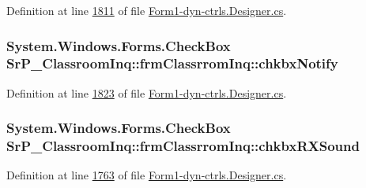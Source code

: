 \-Definition at line \hyperlink{_form1-dyn-ctrls_8_designer_8cs_source_l01811}{1811} of file \hyperlink{_form1-dyn-ctrls_8_designer_8cs_source}{\-Form1-\/dyn-\/ctrls.\-Designer.\-cs}.

\hypertarget{class_sr_p___classroom_inq_1_1frm_classrrom_inq_a86f98a8c743985a65d129f24ed240ba6}{
\subsubsection[{chkbx\-Notify}]{\setlength{\rightskip}{0pt plus 5cm}\-System.\-Windows.\-Forms.\-Check\-Box {\bf \-Sr\-P\-\_\-\-Classroom\-Inq\-::frm\-Classrrom\-Inq\-::chkbx\-Notify}}}
\label{class_sr_p___classroom_inq_1_1frm_classrrom_inq_a86f98a8c743985a65d129f24ed240ba6}


\-Definition at line \hyperlink{_form1-dyn-ctrls_8_designer_8cs_source_l01823}{1823} of file \hyperlink{_form1-dyn-ctrls_8_designer_8cs_source}{\-Form1-\/dyn-\/ctrls.\-Designer.\-cs}.

\hypertarget{class_sr_p___classroom_inq_1_1frm_classrrom_inq_af7626aaecde3bb58d5cfee3957410aa8}{
\subsubsection[{chkbx\-R\-X\-Sound}]{\setlength{\rightskip}{0pt plus 5cm}\-System.\-Windows.\-Forms.\-Check\-Box {\bf \-Sr\-P\-\_\-\-Classroom\-Inq\-::frm\-Classrrom\-Inq\-::chkbx\-R\-X\-Sound}}}
\label{class_sr_p___classroom_inq_1_1frm_classrrom_inq_af7626aaecde3bb58d5cfee3957410aa8}


\-Definition at line \hyperlink{_form1-dyn-ctrls_8_designer_8cs_source_l01763}{1763} of file \hyperlink{_form1-dyn-ctrls_8_designer_8cs_source}{\-Form1-\/dyn-\/ctrls.\-Designer.\-cs}.

